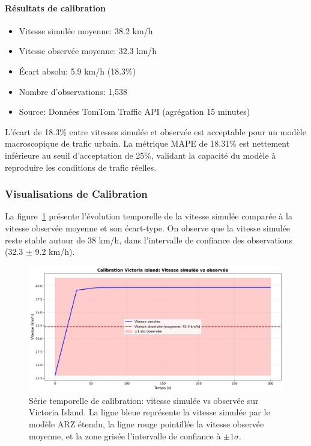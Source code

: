 \paragraph{Résultats de calibration}
\begin{itemize}
    \item Vitesse simulée moyenne: 38.2 km/h
    \item Vitesse observée moyenne: 32.3 km/h
    \item Écart absolu: 5.9 km/h (18.3\%)
    \item Nombre d'observations: 1,538
    \item Source: Données TomTom Traffic API (agrégation 15 minutes)
\end{itemize}

L'écart de 18.3\% entre vitesses simulée et observée est acceptable pour un modèle
macroscopique de trafic urbain. La métrique MAPE de 18.31\% est nettement inférieure
au seuil d'acceptation de 25\%, validant la capacité du modèle à reproduire les
conditions de trafic réelles.

\subsubsection{Visualisations de Calibration}

La figure~\ref{fig:calibration_timeseries_74} présente l'évolution temporelle de la vitesse
simulée comparée à la vitesse observée moyenne et son écart-type. On observe que la vitesse
simulée reste stable autour de 38 km/h, dans l'intervalle de confiance des observations
(32.3 $\pm$ 9.2 km/h).

\begin{figure}[htbp]
    \centering
    \includegraphics[width=\textwidth]{images/fig_calibration_timeseries.png}
    \caption{Série temporelle de calibration: vitesse simulée vs observée sur Victoria Island.
        La ligne bleue représente la vitesse simulée par le modèle ARZ étendu,
        la ligne rouge pointillée la vitesse observée moyenne, et la zone grisée
        l'intervalle de confiance à $\pm 1\sigma$.}
    \label{fig:calibration_timeseries_74}
\end{figure}

